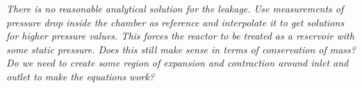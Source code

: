 {\color{greenColor}\itshape
There is no reasonable analytical solution for the leakage.
Use measurements of pressure drop inside the chamber as reference and interpolate it to get solutions for higher pressure values.
This forces the reactor to be treated as a reservoir with some static pressure.
Does this still make sense in terms of conservation of mass?
Do we need to create some region of expansion and contraction around inlet and outlet to make the equations work?
}
